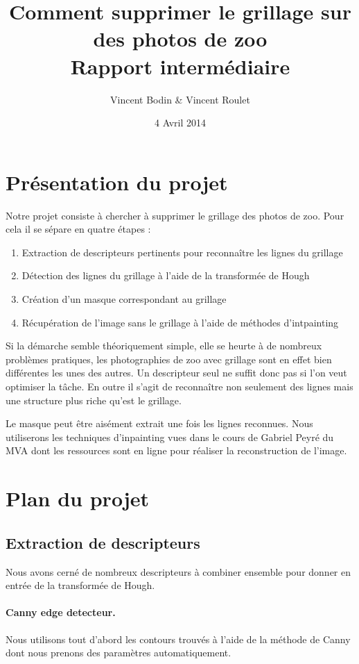 \documentclass[10pt,a4paper]{article}
\title{Comment supprimer le grillage sur des photos de zoo\\ Rapport intermédiaire}
\author{Vincent Bodin \& Vincent Roulet}
\date{4 Avril 2014}
\begin{document}
\maketitle
\hrulefill

\section{Présentation du projet}
Notre projet consiste à chercher à supprimer le grillage des photos de zoo. Pour cela il se sépare en quatre étapes :
\begin{enumerate}
\item Extraction de descripteurs pertinents pour reconnaître les lignes du grillage
\item Détection des lignes du grillage à l'aide de la transformée de Hough
\item Création d'un masque correspondant au grillage
\item Récupération de l'image sans le grillage à l'aide de méthodes d'intpainting
\end{enumerate}

Si la démarche semble théoriquement simple, elle se heurte à de nombreux problèmes pratiques, les photographies de zoo avec grillage sont en effet bien différentes les unes des autres. Un descripteur seul ne suffit donc pas si l'on veut optimiser la tâche. En outre il s'agit de reconnaître non seulement des lignes mais une structure plus riche qu'est le grillage.

Le masque peut être aisément extrait une fois les lignes reconnues. Nous utiliserons les techniques d'inpainting vues dans le cours de Gabriel Peyré du MVA dont les ressources sont en ligne pour réaliser la reconstruction de l'image.

\section{Plan du projet}
\subsection{Extraction de descripteurs}
Nous avons cerné de nombreux descripteurs à combiner ensemble pour donner en entrée de la transformée de Hough.

\paragraph{Canny edge detecteur. }Nous utilisons tout d'abord les contours trouvés à l'aide de la méthode de Canny dont nous prenons des paramètres automatiquement.
\end{document}
